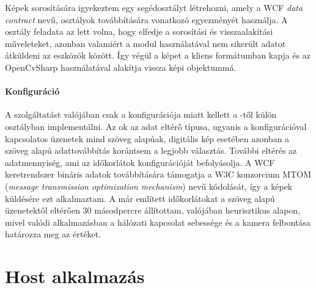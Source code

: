 Képek sorosítására igyekeztem egy segédosztályt létrehozni, amely a WCF \emph{data contract} nevű, osztályok továbbítására vonatkozó egyezményét használja. A  osztály feladata az lett volna, hogy elfedje a sorosítási és visszaalakítási műveleteket, azonban valamiért a modul használatával nem sikerült adatot átküldeni az eszközök között. Így végül a képet a kliens  formátumban kapja és az OpenCvSharp használatával alakítja vissza képi objektummá.

\paragraph{Konfiguráció} 
A szolgáltatást valójában csak a konfigurációja miatt kellett a -től külön osztályban implementálni. Az ok az adat eltérő típusa, ugyanis a konfigurációval kapcsolatos üzenetek mind szöveg alapúak, digitális kép esetében azonban a szöveg alapú adattovábbítás korántsem a legjobb választás. További eltérés az adatmennyiség, ami az időkorlátok konfigurációját befolyásolja. A WCF keretrendszer bináris adatok továbbítására támogatja a W3C konzorcium MTOM (\emph{message transmission optimization mechanism}) nevű kódolását, így a képek küldésére ezt alkalmaztam. A már említett időkorlátokat a szöveg alapú üzenetektől eltérően 30 másodpercre állítottam, valójában heurisztikus alapon, mivel valódi alkalmazásban a hálózati kapcsolat sebessége és a kamera felbontása határozza meg az értéket.

\section{Host alkalmazás} \label{section:RpiRemoteHost}

